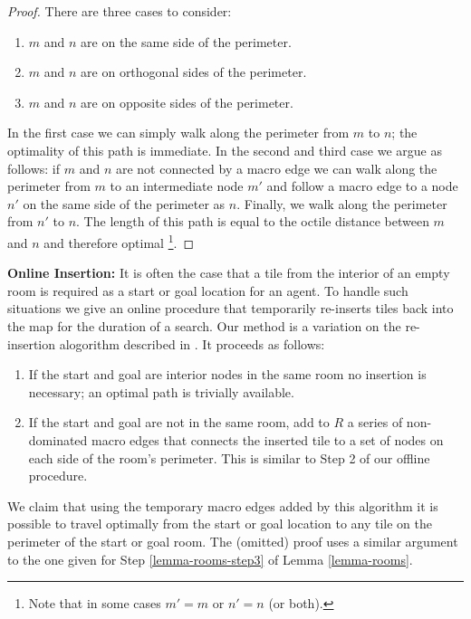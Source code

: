 \begin{proof}
There are three cases to consider:
\begin{enumerate}
\item{$m$ and $n$ are on the same side of the perimeter.}
\item{$m$ and $n$ are on orthogonal sides of the perimeter.}
\item{\label{lemma-rooms-step3} $m$ and $n$ are on opposite sides of the perimeter.}
\end{enumerate}
In the first case we can simply walk along the perimeter from $m$ to $n$; the optimality of this path is immediate. 
In the second and third case we argue as follows: if $m$ and $n$ are not connected by a macro edge
we can walk along the perimeter from $m$ to an intermediate node $m'$ and follow a macro edge to a node $n'$ on the 
same side of the perimeter as $n$. Finally, we walk along the perimeter from $n'$ to $n$.
The length of this path is equal to the octile distance between $m$ and $n$ and therefore optimal
\footnote{Note that in some cases $m' = m$ or $n' = n$ (or both).}.
\end{proof}

\noindent
\textbf{Online Insertion:}
It is often the case that a tile from the interior of an empty room is required as a start or goal location for an
agent. 
To handle such situations we give an online procedure that temporarily re-inserts tiles back into the map for the duration
of a search. 
Our method is a variation on the re-insertion alogorithm described in \cite{harabor10}. It proceeds as follows:

\begin{enumerate}
\item{If the start and goal are interior nodes in the same room no insertion is necessary; an optimal
path is trivially available. }
\item{If the start and goal are not in the same room, add to $R$ a series of non-dominated macro edges that connects
the inserted tile to a set of nodes on each side of the room's perimeter. This is similar to Step 2 of our offline procedure.}
\end{enumerate}

We claim that using the temporary macro edges added by this algorithm it is possible to travel optimally from the start or goal 
location to any tile on the perimeter of the start or goal room. 
The (omitted) proof uses a similar argument to the one given for Step \ref{lemma-rooms-step3} of Lemma \ref{lemma-rooms}.
